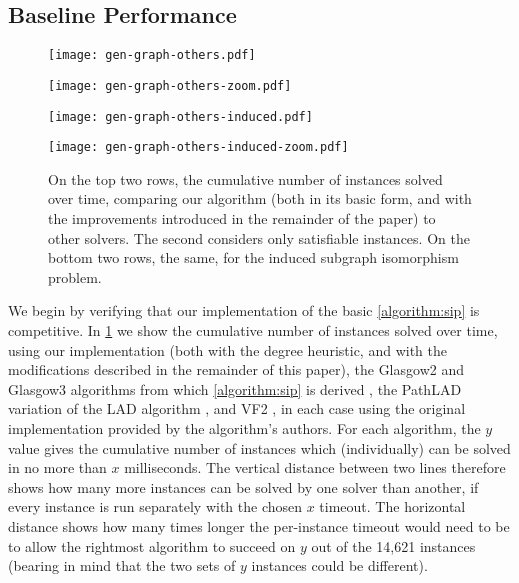 \documentclass[letterpaper]{article} %
\begin{document}
\subsection{Baseline Performance}

\begin{figure}[p]
    \centering
    \texttt{[image: gen-graph-others.pdf]}

    \smallskip

    \centering
    \texttt{[image: gen-graph-others-zoom.pdf]}

    \bigskip

    \centering
    \texttt{[image: gen-graph-others-induced.pdf]}

    \smallskip

    \centering
    \texttt{[image: gen-graph-others-induced-zoom.pdf]}

    \caption{On the top two rows, the cumulative number of instances solved over time, comparing our algorithm
    (both in its basic form, and with the improvements introduced in the remainder of the paper) to
    other solvers. The second considers only satisfiable instances. On the bottom two rows, the same,
    for the induced subgraph isomorphism problem.}
    \label{figure:others}
\end{figure}

We begin by verifying that our implementation of the basic \cref{algorithm:sip} is competitive. In
\cref{figure:others} we show the cumulative number of instances solved over time, using our
implementation (both with the degree heuristic, and with the modifications described in the
remainder of this paper), the Glasgow2 and Glasgow3 algorithms from which \cref{algorithm:sip} is derived
\cite{DBLP:conf/cp/McCreeshP15,DBLP:conf/lion/KotthoffMS16}, the PathLAD variation of the LAD
algorithm \cite{DBLP:journals/ai/Solnon10,DBLP:conf/lion/KotthoffMS16}, and VF2
\cite{DBLP:journals/pami/CordellaFSV04}, in each case using the original implementation provided
by the algorithm's authors. For each algorithm, the $y$ value
gives the cumulative number of instances which (individually) can be solved in no more than $x$
milliseconds.  The vertical distance between two lines therefore shows how many more instances can
be solved by one solver than another, if every instance is run separately with the chosen $x$
timeout. The horizontal distance shows how many times longer the per-instance timeout would need to
be to allow the rightmost algorithm to succeed on $y$ out of the 14,621 instances (bearing in mind
that the two sets of $y$ instances could be different).
\end{document}
